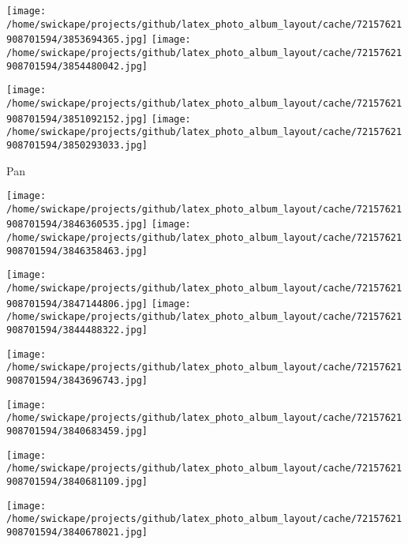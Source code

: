 \documentclass[10pt,letterpaper]{article}
\begin{document}
\pagebreak

\texttt{[image: /home/swickape/projects/github/latex\_photo\_album\_layout/cache/72157621908701594/3853694365.jpg]}
\texttt{[image: /home/swickape/projects/github/latex\_photo\_album\_layout/cache/72157621908701594/3854480042.jpg]}

\texttt{[image: /home/swickape/projects/github/latex\_photo\_album\_layout/cache/72157621908701594/3851092152.jpg]}
\texttt{[image: /home/swickape/projects/github/latex\_photo\_album\_layout/cache/72157621908701594/3850293033.jpg]}

Pan\\



\pagebreak

\texttt{[image: /home/swickape/projects/github/latex\_photo\_album\_layout/cache/72157621908701594/3846360535.jpg]}
\texttt{[image: /home/swickape/projects/github/latex\_photo\_album\_layout/cache/72157621908701594/3846358463.jpg]}

\texttt{[image: /home/swickape/projects/github/latex\_photo\_album\_layout/cache/72157621908701594/3847144806.jpg]}
\texttt{[image: /home/swickape/projects/github/latex\_photo\_album\_layout/cache/72157621908701594/3844488322.jpg]}





\pagebreak

\texttt{[image: /home/swickape/projects/github/latex\_photo\_album\_layout/cache/72157621908701594/3843696743.jpg]}

\vspace{0.25in}
\texttt{[image: /home/swickape/projects/github/latex\_photo\_album\_layout/cache/72157621908701594/3840683459.jpg]}



\pagebreak

\texttt{[image: /home/swickape/projects/github/latex\_photo\_album\_layout/cache/72157621908701594/3840681109.jpg]}

\vspace{0.25in}
\texttt{[image: /home/swickape/projects/github/latex\_photo\_album\_layout/cache/72157621908701594/3840678021.jpg]}
\end{document}
